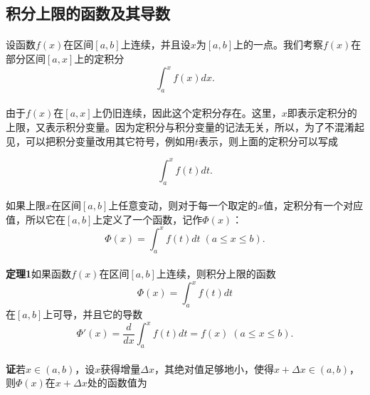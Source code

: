 \subsection{积分上限的函数及其导数}
\paragraph{}
设函数$f(x)$在区间$[a,b]$上连续，并且设$x$为$[a,b]$上的一点。我们考察$f(x)$在部分区间$[a,x]$上的定积分
\begin{equation*}
  \int_a^xf(x)dx.
\end{equation*}

\paragraph{}
由于$f(x)$在$[a,x]$上仍旧连续，因此这个定积分存在。这里，$x$即表示定积分的上限，又表示积分变量。因为定积分与积分变量的记法无关，所以，为了不混淆起见，可以把积分变量改用其它符号，例如用$t$表示，则上面的定积分可以写成

\begin{equation*}
  \int_a^xf(t)dt.
\end{equation*}

\paragraph{}
如果上限$x$在区间$[a,b]$上任意变动，则对于每一个取定的$x$值，定积分有一个对应值，所以它在$[a,b]$上定义了一个函数，记作$\Phi(x)$：
\begin{equation*}
  \Phi(x) = \int_a^xf(t)dt \; (a\leq x \leq b).
\end{equation*}

\paragraph{}
\textbf{定理1\;}如果函数$f(x)$在区间$[a,b]$上连续，则积分上限的函数
\begin{equation}
  \Phi(x) = \int_a^xf(t)dt
\end{equation}
在$[a,b]$上可导，并且它的导数
\begin{equation}
  \Phi'(x) = \frac{d}{dx}\int_a^xf(t)dt = f(x) \; (a \leq x \leq b).
\end{equation}

\paragraph{}
\textbf{证\;}若$x\in(a,b)$，设$x$获得增量$\Delta x$，其绝对值足够地小，使得$x+\Delta x\in(a,b)$，则$\Phi(x)$在$x+\Delta x$处的函数值为

